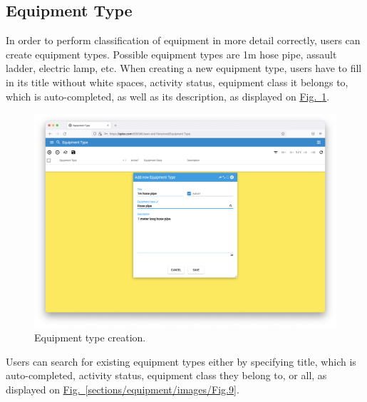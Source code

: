 \newpage	
\subsection{Equipment Type}

In order to perform classification of equipment in more detail correctly, users can create equipment types. Possible equipment types are 1m hose pipe, assault ladder, electric lamp, etc. When creating a new equipment type, users have to fill in its title without white spaces, activity status, equipment class it belongs to, which is auto-completed, as well as its description, as displayed on \hyperref[sections/equipment/images/Fig.8]{Fig.~\ref*{sections/equipment/images/Fig.8}}. 

    \begin{figure}[!htbp]
	\centering
	\includegraphics[width=0.95\linewidth]{sections/equipment/images/Fig.8.png}
	\caption{Equipment type creation.}\label{sections/equipment/images/Fig.8}
	\end{figure}

\newpage
Users can search for existing equipment types either by specifying title, which is auto-completed, activity status, equipment class they belong to, or all, as displayed on \hyperref[sections/equipment/images/Fig.9]{Fig.~\ref*{sections/equipment/images/Fig.9}}.


